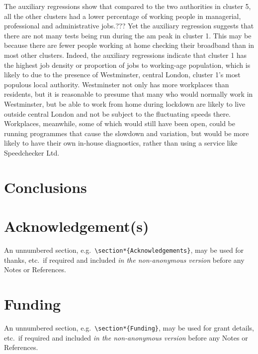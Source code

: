 \documentclass[]{interact}
\theoremstyle{plain}%
\theoremstyle{definition}
\theoremstyle{remark}
\begin{document}
The auxiliary regressions show that compared to the two authorities in
cluster 5, all the other clusters had a lower percentage of working
people in managerial, professional and administrative jobs.??? Yet the
auxiliary regression suggests that there are not many tests being run
during the am peak in cluster 1. This may be because there are fewer
people working at home checking their broadband than in most other
clusters. Indeed, the auxiliary regressions indicate that cluster 1 has
the highest job density or proportion of jobs to working-age population,
which is likely to due to the presence of Westminster, central London,
cluster 1's most populous local authority. Westminster not only has more
workplaces than residents, but it is reasonable to presume that many who
would normally work in Westminster, but be able to work from home during
lockdown are likely to live outside central London and not be subject to
the fluctuating speeds there. Workplaces, meanwhile, some of which would
still have been open, could be running programmes that cause the
slowdown and variation, but would be more likely to have their own
in-house diagnostics, rather than using a service like Speedchecker Ltd.

\hypertarget{conclusions}{%
\section{Conclusions}\label{conclusions}}

\hypertarget{acknowledgements}{%
\section*{Acknowledgement(s)}\label{acknowledgements}}

An unnumbered section,
e.g.~\texttt{\textbackslash{}section*\{Acknowledgements\}}, may be used
for thanks, etc.~if required and included \emph{in the non-anonymous
version} before any Notes or References.

\hypertarget{funding}{%
\section*{Funding}\label{funding}}

An unnumbered section,
e.g.~\texttt{\textbackslash{}section*\{Funding\}}, may be used for grant
details, etc.~if required and included \emph{in the non-anonymous
version} before any Notes or References.






\end{document}
